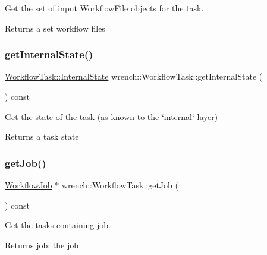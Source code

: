 Get the set of input \hyperlink{classwrench_1_1_workflow_file}{Workflow\+File} objects for the task. 

\begin{DoxyReturn}{Returns}
a set workflow files 
\end{DoxyReturn}
\mbox{\label{classwrench_1_1_workflow_task_a3b13bbd16eb3eefcbcbc6964613b70bc}} 
\subsubsection{\texorpdfstring{get\+Internal\+State()}{getInternalState()}}
{\footnotesize\ttfamily \hyperlink{classwrench_1_1_workflow_task_aa2b860941b37263c26385fd076502e04}{Workflow\+Task\+::\+Internal\+State} wrench\+::\+Workflow\+Task\+::get\+Internal\+State (\begin{DoxyParamCaption}{ }\end{DoxyParamCaption}) const}



Get the state of the task (as known to the \char`\"{}internal\char`\"{} layer) 

\begin{DoxyReturn}{Returns}
a task state 
\end{DoxyReturn}
\mbox{\label{classwrench_1_1_workflow_task_aa49cf3afae40d6dcf7394cd94fd4918f}} 
\subsubsection{\texorpdfstring{get\+Job()}{getJob()}}
{\footnotesize\ttfamily \hyperlink{classwrench_1_1_workflow_job}{Workflow\+Job} $\ast$ wrench\+::\+Workflow\+Task\+::get\+Job (\begin{DoxyParamCaption}{ }\end{DoxyParamCaption}) const}



Get the task\textquotesingle{}s containing job. 

\begin{DoxyReturn}{Returns}
job\+: the job 
\end{DoxyReturn}
\mbox{\label{classwrench_1_1_workflow_task_aa470fe4c0a34211165989afabcba795f}} 
